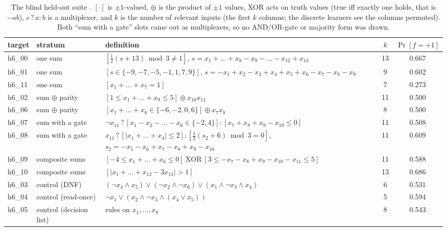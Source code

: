 \begin{table}[t]
\centering\footnotesize\renewcommand{\arraystretch}{1.12}
\begin{tabularx}{\linewidth}{l>{\raggedright\arraybackslash}p{2.2cm}>{\raggedright\arraybackslash}Xcc}
\toprule
target & stratum & definition & $k$ & $\Pr[f=+1]$\\
\midrule
h6\_00 & one sum & $[\tfrac12(s+13)\bmod3\ne1]$, $s=x_1+\dots+x_8-x_9-\dots-x_{12}+x_{13}$ & 13 & 0.667\\
h6\_01 & one sum & $[s\in\{-9,-7,-5,-1,1,7,9\}]$, $s=-x_1+x_2-x_3+x_4+x_5+x_6-x_7-x_8-x_9$ & 9 & 0.602\\
h6\_11 & one sum & $[x_1+\dots+x_7=1]$ & 7 & 0.273\\
h6\_02 & sum $\oplus$ parity & $[1\le x_1+\dots+x_9\le5]\oplus x_{10}x_{11}$ & 11 & 0.500\\
h6\_06 & sum $\oplus$ parity & $[x_1+\dots+x_6\in\{-6,-2,0,6\}]\oplus x_7x_8$ & 8 & 0.500\\
h6\_07 & sum with a gate & $\lnot x_{11}\,?\,[x_1-x_2-\dots-x_6\in\{-2,4\}] : [x_7+x_8+x_9-x_{10}\le0]$ & 11 & 0.508\\
h6\_08 & sum with a gate & $x_{11}\,?\,[|x_1+\dots+x_4|\le2] : [\tfrac12(s_2+6)\bmod3=0]$, $s_2=-x_5-x_6+x_7-x_8+x_9-x_{10}$ & 11 & 0.609\\
h6\_09 & composite sums & $[-4\le x_1+\dots+x_6\le0]\ \mathrm{XOR}\ [3\le-x_7-x_8+x_9-x_{10}-x_{11}\le5]$ & 11 & 0.588\\
h6\_10 & composite sums & $[|x_1+\dots+x_{12}-3x_{13}|>1]$ & 13 & 0.686\\
h6\_03 & control (DNF) & $(\lnot x_4\wedge x_5)\vee(\lnot x_2\wedge\lnot x_6)\vee(x_1\wedge\lnot x_3\wedge x_4)$ & 6 & 0.531\\
h6\_04 & control (read-once) & $\lnot x_1\vee(x_2\wedge\lnot x_3\wedge(x_4\vee x_5))$ & 5 & 0.594\\
h6\_05 & control (decision list) & 7 rules on $x_1,\dots,x_8$ & 8 & 0.543\\
\bottomrule
\end{tabularx}
\caption{The blind held-out suite . $[\cdot]$ is $\pm1$-valued, $\oplus$ is the product of $\pm1$ values, XOR acts on truth values (true iff exactly one holds, that is $-ab$), $c\,?\,a:b$ is a multiplexer, and $k$ is the number of relevant inputs (the first $k$ columns; the discrete learners see the columns permuted). Both ``sum with a gate'' slots came out as multiplexers, so no AND/OR-gate or majority form was drawn.}
\label{tab:dlheld6}
\end{table}

